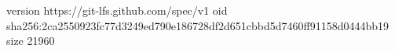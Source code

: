 version https://git-lfs.github.com/spec/v1
oid sha256:2ca2550923fc77d3249ed790e186728df2d651cbbd5d7460ff91158d0444bb19
size 21960
